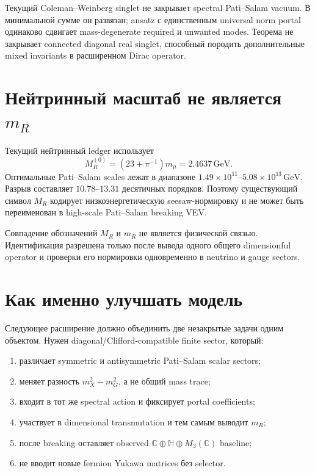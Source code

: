 \begin{theorem}
Текущий Coleman--Weinberg singlet не закрывает spectral Pati--Salam vacuum.
В минимальной сумме он развязан; ansatz с единственным universal norm portal
одинаково сдвигает mass-degenerate required и unwanted modes. Теорема не
закрывает connected diagonal real singlet, способный породить дополнительные
mixed invariants в расширенном Dirac operator.
\end{theorem}

\section{\texorpdfstring{Нейтринный масштаб не является \(m_R\)}{Нейтринный масштаб не является mR}}

Текущий нейтринный ledger использует
\begin{equation}
 M_R^{(0)}=(23+\pi^{-1})m_\mu=2.4637\,\mathrm{GeV}.
\end{equation}
Оптимальные Pati--Salam scales лежат в диапазоне
\(1.49\times10^{11}\)--\(5.08\times10^{13}\,\mathrm{GeV}\). Разрыв
составляет \(10.78\)--\(13.31\) десятичных порядков. Поэтому существующий
символ \(M_R\) кодирует низкоэнергетическую seesaw-нормировку и не может
быть переименован в high-scale Pati--Salam breaking VEV.

\begin{nogocriterion}
Совпадение обозначений \(M_R\) и \(m_R\) не является физической связью.
Идентификация разрешена только после вывода одного общего dimensionful
operator и проверки его нормировки одновременно в neutrino и gauge sectors.
\end{nogocriterion}

\section{Как именно улучшать модель}

Следующее расширение должно объединить две незакрытые задачи одним объектом.
Нужен diagonal/Clifford-compatible finite sector, который:
\begin{enumerate}
 \item различает symmetric и antisymmetric Pati--Salam scalar sectors;
 \item меняет разность \(m_X^2-m_G^2\), а не общий mass trace;
 \item входит в тот же spectral action и фиксирует portal coefficients;
 \item участвует в dimensional transmutation и тем самым выводит \(m_R\);
 \item после breaking оставляет observed
 \(\mathbb C\oplus\mathbb H\oplus M_3(\mathbb C)\) baseline;
 \item не вводит новые fermion Yukawa matrices без selector.
\end{enumerate}

